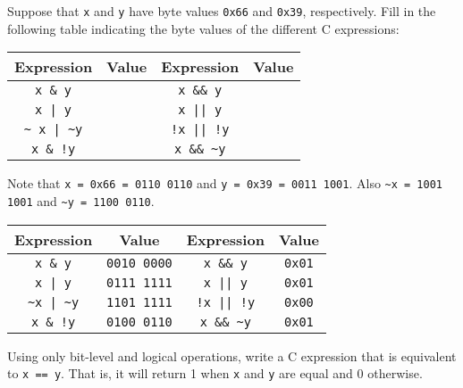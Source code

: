 \documentclass[12pt]{article}
\newenvironment{ex}[2][Exercise]{\begin{trivlist}
		\item[\hskip \labelsep {\bfseries #1}\hskip \labelsep {\bfseries #2.}]}{\end{trivlist}}
\newenvironment{sol}[1][Solution]{\begin{trivlist}
		\item[\hskip \labelsep {\bfseries #1:}]}{\end{trivlist}}
\begin{document}
\begin{ex}{2.14}
	Suppose that \texttt{x} and \texttt{y} have byte values \texttt{0x66} and
	\texttt{0x39}, respectively. Fill in the following table indicating the byte
	values of the different C expressions:
	\begin{center}
		\begin{tabular}{cc|cc}
			Expression & Value & Expression & Value\\
			\hline
			\texttt{x \& y} & \makebox[1cm]{\hrulefill} & \texttt{x \&\& y} & \makebox[1cm]{\hrulefill}\\
			\texttt{x | y} & \makebox[1cm]{\hrulefill} & \texttt{x || y} & \makebox[1cm]{\hrulefill}\\
			\texttt{\~{} x | \~{}y} & \makebox[1cm]{\hrulefill} & \texttt{!x || !y} & \makebox[1cm]{\hrulefill}\\
			\texttt{x \& !y} & \makebox[1cm]{\hrulefill} & \texttt{x \&\& \~{}y} & \makebox[1cm]{\hrulefill}\\
		\end{tabular}
	\end{center}
\end{ex}

\begin{sol}
	Note that \texttt{x = 0x66 = 0110 0110} and \texttt{y = 0x39 = 0011 1001}. Also
	\texttt{\~{}x = 1001 1001} and \texttt{\~{}y = 1100 0110}.
	\begin{center}
	
		\begin{tabular}{cc|cc}
			Expression & Value & Expression & Value\\
			\hline
			\texttt{x \& y} & \texttt{0010 0000} & \texttt{x \&\& y} & \texttt{0x01}\\
			\texttt{x | y} & \texttt{0111 1111} & \texttt{x || y} & \texttt{0x01}\\
			\texttt{\~{}x | \~{}y} & \texttt{1101 1111} & \texttt{!x || !y} & \texttt{0x00}\\
			\texttt{x \& !y} & \texttt{0100 0110} & \texttt{x \&\& \~{}y} & \texttt{0x01}\\
		\end{tabular}
	\end{center}
\end{sol}

\begin{ex}{2.15}
	Using only bit-level and logical operations, write a C expression that is equivalent
	to \texttt{x == y}. That is, it will return 1 when \texttt{x} and \texttt{y} are equal
	and 0 otherwise.
\end{ex}
\end{document}
